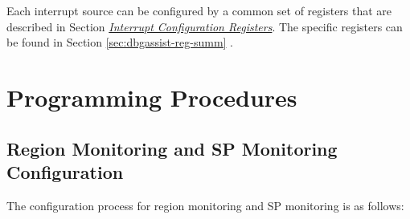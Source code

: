 \documentclass[main\_\_EN.tex]{subfiles}
\begin{document}
Each interrupt source can be configured by a common set of registers that are described in Section \hyperref[interrupt-config-registers]{\textit{Interrupt Configuration Registers}}. The specific registers can be found in Section \ref{sec:dbgassist-reg-summ} \textit{}.


\section{Programming Procedures}
\label{sec:dbgassist-prog-procedures}

\subsection{Region Monitoring and SP Monitoring Configuration}

The configuration process for region monitoring and SP monitoring is as follows:
\end{document}
